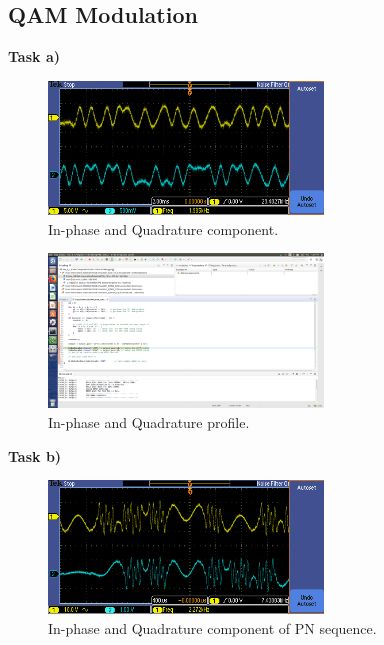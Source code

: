 \documentclass{article}
\begin{document}
\subsection{QAM Modulation}

\textbf{Task a)}
\begin{figure}[h]
  \begin{center}
    \includegraphics[width=0.65\textwidth]{img/task_a_oscilloscope.png}
    \caption{In-phase and Quadrature component.}
  \end{center}
\end{figure}

\begin{figure}[h]
  \begin{center}
    \includegraphics[width=0.65\textwidth]{img/task_a_profile.png}
    \caption{In-phase and Quadrature profile.}
  \end{center}
\end{figure}

\pagebreak
\textbf{Task b)}

\begin{figure}[h]
  \begin{center}
    \includegraphics[width=0.65\textwidth]{img/task_b_oscilloscope.png}
    \caption{In-phase and Quadrature component of PN sequence.}
  \end{center}
\end{figure}
\end{document}

